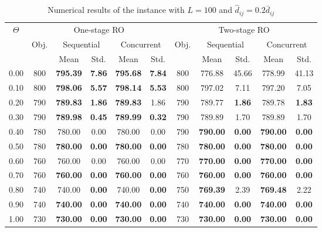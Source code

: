 \documentclass[preprint,review,10pt,round,authoryear]{elsarticle}\usepackage[]{graphicx}\usepackage[]{color}
\theoremstyle{plain}
\theoremstyle{definition}
\theoremstyle{remark}
\begin{document}
\begin{table*}[!ht]
\small
      \caption{Numerical results of the instance with $L=100$ and $\hat{d}_{ij}= 0.2\bar{d}_{ij} $}
      \begin{center}
      \begin{tabular}{||c| c| c| c| c| c| c| c| c|c|c||}
      \hline
      \hline
      \multirow{3}{*}{$\Theta$} &
      \multicolumn{5}{|c|}{One-stage RO} &
      \multicolumn{5}{|c||}{Two-stage RO} \\
      \cline{2-6}
      \cline{7-11}
      &\multirow{2}{*}{Obj.} &
      \multicolumn{2}{|c|}{Sequential} &
      \multicolumn{2}{|c|}{Concurrent} &
      \multirow{2}{*}{Obj.} &
      \multicolumn{2}{|c|}{Sequential} &
      \multicolumn{2}{|c||}{Concurrent}\\
      \cline{3-6}
      \cline{8-11}
      &&Mean&Std.&Mean&Std.&&Mean&Std.&Mean&Std.\\
      \hline%
  \hline
0.00 & 800 & \textbf{795.39} & \textbf{7.86} & \textbf{795.68} & \textbf{7.84} & 800 & 776.88 & 45.66 & 778.99 & 41.13 \\ 
   \hline
0.10 & 800 & \textbf{798.06} & \textbf{5.57} & \textbf{798.14} & \textbf{5.53} & 800 & 797.02 & 7.11 & 797.20 & 7.05 \\ 
   \hline
0.20 & 790 & \textbf{789.83} & \textbf{1.86 }& \textbf{789.83} & 1.86 & 790 & 789.77 & \textbf{1.86} & 789.78 & \textbf{1.83} \\ 
   \hline
0.30 & 790 &\textbf{ 789.98} & \textbf{0.45 }& \textbf{789.99} & \textbf{0.32} & 790 & 789.89 & 1.70 & 789.89 & 1.70 \\ 
   \hline
0.40 & 780 & 780.00 & 0.00 & 780.00 & 0.00 & 790 & \textbf{790.00} & \textbf{0.00} & \textbf{790.00} & \textbf{0.00} \\ 
   \hline
0.50 & 780 & \textbf{780.00} & \textbf{0.00} & \textbf{780.00} & \textbf{0.00} & 780 & \textbf{780.00} &\textbf{ 0.00} & \textbf{780.00} & \textbf{0.00} \\ 
   \hline
0.60 & 760 & 760.00 & 0.00 & 760.00 & 0.00 & 770 & \textbf{770.00} &\textbf{ 0.00} & \textbf{770.00} & \textbf{0.00} \\ 
   \hline
0.70 & 760 & \textbf{760.00} & \textbf{0.00} & \textbf{760.00} & \textbf{0.00} & 760 & \textbf{760.00} & \textbf{0.00} & \textbf{760.00} & \textbf{0.00} \\ 
   \hline
0.80 & 740 & 740.00 & \textbf{0.00} & 740.00 & \textbf{0.00} & 750 & \textbf{769.39} & 2.39 & \textbf{769.48} & 2.22 \\ 
   \hline
0.90 & 740 & \textbf{740.00} & \textbf{0.00 }& \textbf{740.00} & \textbf{0.00} & 740 & \textbf{740.00} & \textbf{0.00} & \textbf{740.00} & \textbf{0.00} \\ 
   \hline
1.00 & 730 & \textbf{730.00} & \textbf{0.00} & \textbf{730.00} & \textbf{0.00} & 730 & \textbf{730.00} & \textbf{0.00} & \textbf{730.00} & \textbf{0.00} \\ 
  \hline
\hline
      \end{tabular}
      \end{center}
      \label{table:5}
      \end{table*}
\end{document}
